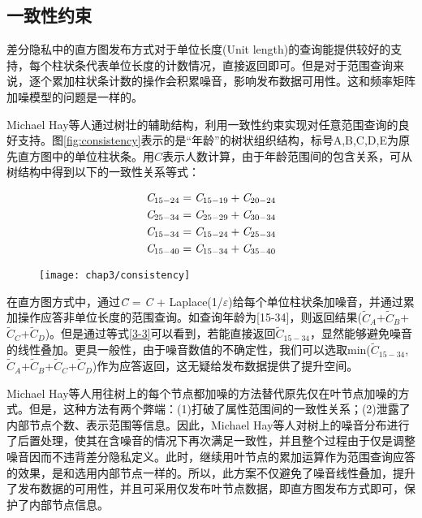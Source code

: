 \subsection{一致性约束}

差分隐私中的直方图发布方式对于单位长度(Unit length)的查询能提供较好的支持，每个柱状条代表单位长度的计数情况，直接返回即可。但是对于范围查询来说，逐个累加柱状条计数的操作会积累噪音，影响发布数据可用性。这和频率矩阵加噪模型的问题是一样的。

Michael Hay等人通过树壮的辅助结构，利用一致性约束实现对任意范围查询的良好支持。图\ref{fig:consistency}表示的是“年龄”的树状组织结构，标号A,B,C,D,E为原先直方图中的单位柱状条。用$C$表示人数计算，由于年龄范围间的包含关系，可从树结构中得到以下的一致性关系等式：

\begin{eqnarray}
\setcounter{equation}{1}
&{\it{C}}_{15-24} = {\it{C}}_{15-19}+{\it{C}}_{20-24}\\
&{\it{C}}_{25-34} = {\it{C}}_{25-29}+{\it{C}}_{30-34}\\
&\label{3-3}{\it{C}}_{15-34} = {\it{C}}_{15-24}+{\it{C}}_{25-34}\\
&{\it{C}}_{15-40} = {\it{C}}_{15-34}+{\it{C}}_{35-40}
\end{eqnarray}

\begin{figure}[!htp]
	\centering
	\texttt{[image: chap3/consistency]}
\end{figure}

在直方图方式中，通过{\it{\~{C}}} = {\it{C}} + Laplace(1/$\varepsilon$)给每个单位柱状条加噪音，并通过累加操作应答非单位长度的范围查询。如查询年龄为[15-34]，则返回结果({$\widetilde{C}_{A}$}+{$\widetilde{C}_{B}$}+{$\widetilde{C}_{C}$}+{$\widetilde{C}_{D}$})。但是通过等式\ref{3-3}可以看到，若能直接返回{$\widetilde{C}_{15-34}$}，显然能够避免噪音的线性叠加。更具一般性，由于噪音数值的不确定性，我们可以选取min({$\widetilde{C}_{15-34}$},{$\widetilde{C}_{A}$}+{$\widetilde{C}_{B}$}+{$\widetilde{C}_{C}$}+{$\widetilde{C}_{D}$})作为应答返回，这无疑给发布数据提供了提升空间。

Michael Hay等人用往树上的每个节点都加噪的方法替代原先仅在叶节点加噪的方式。但是，这种方法有两个弊端：(1)打破了属性范围间的一致性关系；(2)泄露了内部节点个数、表示范围等信息。因此，Michael Hay等人对树上的噪音分布进行了后置处理，使其在含噪音的情况下再次满足一致性，并且整个过程由于仅是调整噪音因而不违背差分隐私定义。此时，继续用叶节点的累加运算作为范围查询应答的效果，是和选用内部节点一样的。所以，此方案不仅避免了噪音线性叠加，提升了发布数据的可用性，并且可采用仅发布叶节点数据，即直方图发布方式即可，保护了内部节点信息。

